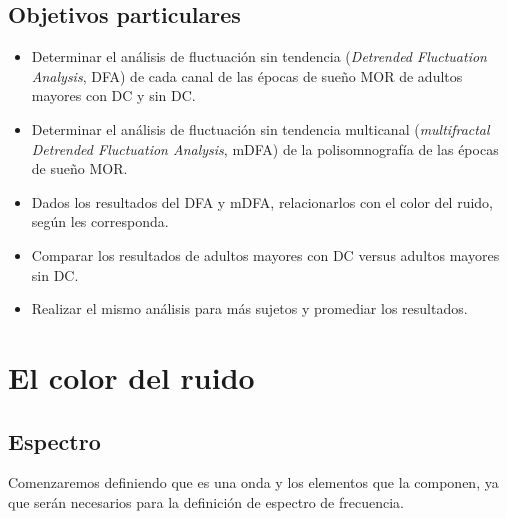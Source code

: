 \documentclass[letterpaper,titlepage,12pt,draft]{report}
\begin{document}
\section{Objetivos particulares}
\begin{itemize}
\item Determinar el an\'alisis de fluctuaci\'on sin tendencia (\textit{Detrended Fluctuation Analysis}, DFA)  de cada canal de las \'epocas de sue\~no MOR de adultos mayores con DC y sin DC.
\item Determinar el an\'alisis de fluctuaci\'on sin tendencia multicanal (\textit{multifractal Detrended Fluctuation Analysis}, mDFA) de la polisomnograf\'ia de las \'epocas de sue\~no MOR.
\item Dados los resultados del DFA y mDFA, relacionarlos con el color del ruido, seg\'un les corresponda. 
\item Comparar los resultados de adultos mayores con DC versus adultos mayores sin DC. 
\item Realizar el mismo an\'alisis para m\'as sujetos y promediar los resultados. 
\end{itemize}


\chapter{El color del ruido}

\section{Espectro}

Comenzaremos definiendo que es una onda y los elementos que la componen, ya que ser\'an necesarios para la definici\'on de espectro de frecuencia.\\
\end{document}
